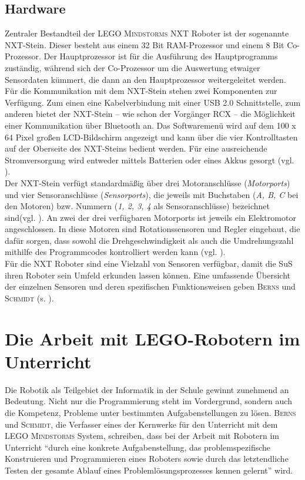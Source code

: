 \documentclass[paper=a4, DIV=14, BCOR=15mm, twoside=on, onecolumn=on, open = right, titlepage =on, parskip =half, headsepline = on, footsepline = on, chapterprefix = on, appendixprefix = off, fontsize = 12pt, numbers = noenddot, abstract = on]{scrbook}
\begin{document}
\subsection{Hardware}
\onehalfspacing
Zentraler Bestandteil der \textsc{LEGO Mindstorms} NXT Roboter ist der sogenannte NXT-Stein. Dieser besteht aus einem 32 Bit RAM-Prozessor und einem 8 Bit Co-Prozessor. Der Hauptprozessor ist für die Ausführung des Hauptprogramms zuständig, während sich der Co-Prozessor um die Auswertung etwaiger Sensordaten kümmert, die dann an den Hauptprozessor weitergeleitet werden. Für die Kommunikation mit dem NXT-Stein stehen zwei Komponenten zur Verfügung. Zum einen eine Kabelverbindung mit einer USB 2.0 Schnittstelle, zum anderen bietet der NXT-Stein -- wie schon der Vorgänger RCX -- die Möglichkeit einer Kommunikation über Bluetooth an. Das Softwaremenü wird auf dem 100 x 64 Pixel großen LCD-Bildschirm angezeigt und kann über die vier Kontrolltasten auf der Oberseite des NXT-Steins bedient werden. Für eine ausreichende Stromversorgung wird entweder mittels Batterien oder eines Akkus gesorgt (vgl. \cite[S.42]{berns:10}).\\
Der NXT-Stein verfügt standardmäßig über drei Motoranschlüsse (\emph{Motorports}) und vier Sensoranschlüsse (\emph{Sensorports}), die jeweils mit Buchstaben (\emph{A, B, C} bei den Motoren) bzw. Nummern (\emph{1, 2, 3, 4} als Sensoranschlüsse) bezeichnet sind(vgl.  \cite[S.43]{berns:10}). An zwei der drei verfügbaren Motorports ist jeweils ein Elektromotor angeschlossen. In diese Motoren sind Rotationssensoren und Regler eingebaut, die dafür sorgen, dass sowohl die Drehgeschwindigkeit als auch die Umdrehungszahl mithilfe des Programmcodes kontrolliert werden kann (vgl. \cite[S.45--47]{berns:10}).\\
Für die NXT Roboter sind eine Vielzahl von Sensoren verfügbar, damit die SuS ihren Roboter sein Umfeld erkunden lassen können. Eine umfassende Übersicht der einzelnen Sensoren und deren spezifischen Funktionsweisen geben \textsc{Berns} und \textsc{Schmidt} (s. \cite[Kapitel 4.2]{berns:10}). 

\par \singlespacing
 \section{Die Arbeit mit LEGO-Robotern im Unterricht}
\onehalfspacing
Die Robotik als Teilgebiet der Informatik in der Schule gewinnt zunehmend an Bedeutung. Nicht nur die Programmierung steht im Vordergrund, sondern auch die Kompetenz, Probleme unter bestimmten Aufgabenstellungen zu lösen. \textsc{Berns} und \textsc{Schmidt}, die Verfasser eines der Kernwerke für den Unterricht mit dem \textsc{LEGO Mindstorms} System, schreiben, dass bei der Arbeit mit Robotern im Unterricht "`durch eine konkrete Aufgabenstellung, das problemspezifische Konstruieren und Programmieren eines Roboters sowie durch das letztendliche Testen der gesamte Ablauf eines Problemlösungsprozesses kennen gelernt"' \cite[S.2]{berns:10} wird.
\end{document}
